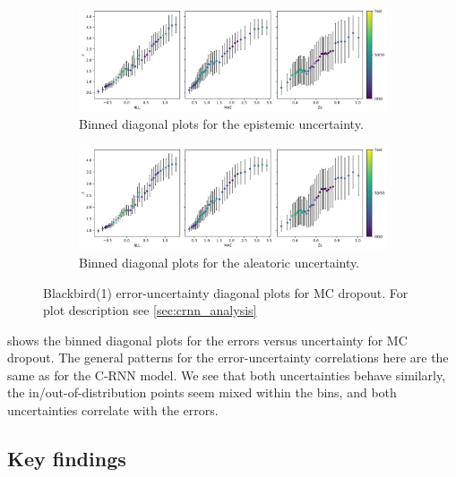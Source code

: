 \begin{figure}[htbp]
  \centering
    \begin{subfigure}[b]{\textwidth}
        \includegraphics[width=\textwidth]{Experiments/figs/binned/bb1_dropout_epistemic.png}
        \caption{Binned diagonal plots for the epistemic uncertainty.}
    \end{subfigure}
    
    \begin{subfigure}[b]{\textwidth}
        \includegraphics[width=\textwidth]{Experiments/figs/binned/bb1_dropout_aleatoric.png}
        \caption{Binned diagonal plots for the aleatoric uncertainty.}
  \end{subfigure}
    \caption[Blackbird(1) error-uncertainty diagonal plots for MC dropout]{Blackbird(1) error-uncertainty diagonal plots for MC dropout. For plot description see \cref{sec:crnn_analysis}}
    \label{fig:bb1_dropout_uncertainty_corr}
\end{figure}

 shows the binned diagonal plots for the errors versus uncertainty for MC dropout. The general patterns for the error-uncertainty correlations here are the same as for the C-RNN model. We see that both uncertainties behave similarly, the in/out-of-distribution points seem mixed within the bins, and both uncertainties correlate with the errors. 



\subsection{Key findings}

